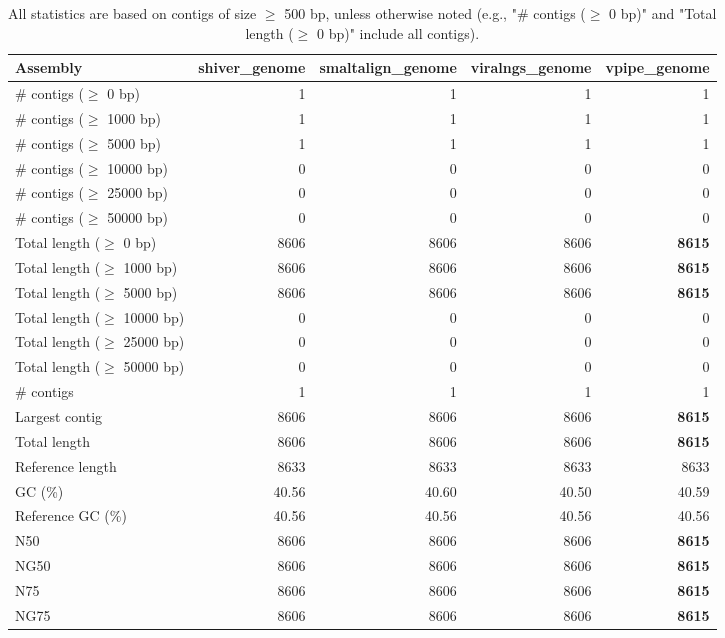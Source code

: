 \documentclass[12pt,a4paper]{article}
\begin{document}
\begin{table}[ht]
\begin{center}
\caption{All statistics are based on contigs of size $\geq$ 500 bp, unless otherwise noted (e.g., "\# contigs ($\geq$ 0 bp)" and "Total length ($\geq$ 0 bp)" include all contigs).}
\begin{tabular}{|l*{4}{|r}|}
\hline
Assembly & shiver\_genome & smaltalign\_genome & viralngs\_genome & vpipe\_genome \\ \hline
\# contigs ($\geq$ 0 bp) & 1 & 1 & 1 & 1 \\ \hline
\# contigs ($\geq$ 1000 bp) & 1 & 1 & 1 & 1 \\ \hline
\# contigs ($\geq$ 5000 bp) & 1 & 1 & 1 & 1 \\ \hline
\# contigs ($\geq$ 10000 bp) & 0 & 0 & 0 & 0 \\ \hline
\# contigs ($\geq$ 25000 bp) & 0 & 0 & 0 & 0 \\ \hline
\# contigs ($\geq$ 50000 bp) & 0 & 0 & 0 & 0 \\ \hline
Total length ($\geq$ 0 bp) & 8606 & 8606 & 8606 & {\bf 8615} \\ \hline
Total length ($\geq$ 1000 bp) & 8606 & 8606 & 8606 & {\bf 8615} \\ \hline
Total length ($\geq$ 5000 bp) & 8606 & 8606 & 8606 & {\bf 8615} \\ \hline
Total length ($\geq$ 10000 bp) & 0 & 0 & 0 & 0 \\ \hline
Total length ($\geq$ 25000 bp) & 0 & 0 & 0 & 0 \\ \hline
Total length ($\geq$ 50000 bp) & 0 & 0 & 0 & 0 \\ \hline
\# contigs & 1 & 1 & 1 & 1 \\ \hline
Largest contig & 8606 & 8606 & 8606 & {\bf 8615} \\ \hline
Total length & 8606 & 8606 & 8606 & {\bf 8615} \\ \hline
Reference length & 8633 & 8633 & 8633 & 8633 \\ \hline
GC (\%) & 40.56 & 40.60 & 40.50 & 40.59 \\ \hline
Reference GC (\%) & 40.56 & 40.56 & 40.56 & 40.56 \\ \hline
N50 & 8606 & 8606 & 8606 & {\bf 8615} \\ \hline
NG50 & 8606 & 8606 & 8606 & {\bf 8615} \\ \hline
N75 & 8606 & 8606 & 8606 & {\bf 8615} \\ \hline
NG75 & 8606 & 8606 & 8606 & {\bf 8615} \\ \hline

\end{tabular}
\end{center}
\end{table}
\end{document}
